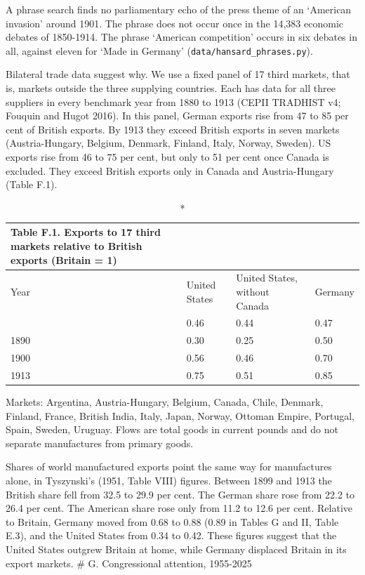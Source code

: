 A phrase search finds no parliamentary echo of the press theme of an
`American invasion' around 1901. The phrase does not occur once in the
14,383 economic debates of 1850-1914. The phrase `American competition'
occurs in six debates in all, against eleven for `Made in Germany'
(\texttt{data/\allowbreak{}hansard\_\allowbreak{}phrases.py}).

Bilateral trade data suggest why. We use a fixed panel of 17 third
markets, that is, markets outside the three supplying countries. Each
has data for all three suppliers in every benchmark year from 1880 to
1913 (CEPII TRADHIST v4; Fouquin and Hugot 2016). In this panel, German
exports rise from 47 to 85 per cent of British exports. By 1913 they
exceed British exports in seven markets (Austria-Hungary, Belgium,
Denmark, Finland, Italy, Norway, Sweden). US exports rise from 46 to 75
per cent, but only to 51 per cent once Canada is excluded. They exceed
British exports only in Canada and Austria-Hungary (Table F.1).

{\footnotesize\begin{longtable}[]{@{}llll@{}}
\caption*{\textbf{Table F.1. Exports to 17 third markets relative to British
exports (Britain = 1)}}\\
\toprule\noalign{}
Year & United States & United States, without Canada & Germany \\
\midrule\noalign{}
\endhead
\bottomrule\noalign{}
\endlastfoot
1880 & 0.46 & 0.44 & 0.47 \\
1890 & 0.30 & 0.25 & 0.50 \\
1900 & 0.56 & 0.46 & 0.70 \\
1913 & 0.75 & 0.51 & 0.85 \\
\end{longtable}}

Markets: Argentina, Austria-Hungary, Belgium, Canada, Chile, Denmark,
Finland, France, British India, Italy, Japan, Norway, Ottoman Empire,
Portugal, Spain, Sweden, Uruguay. Flows are total goods in current
pounds and do not separate manufactures from primary goods.

Shares of world manufactured exports point the same way for manufactures
alone, in Tyszynski's (1951, Table VIII) figures. Between 1899 and 1913
the British share fell from 32.5 to 29.9 per cent. The German share rose
from 22.2 to 26.4 per cent. The American share rose only from 11.2 to
12.6 per cent. Relative to Britain, Germany moved from 0.68 to 0.88
(0.89 in Tables G and II, Table E.3), and the United States from 0.34 to
0.42. These figures suggest that the United States outgrew Britain at
home, while Germany displaced Britain in its export markets. \# G.
Congressional attention, 1955-2025

